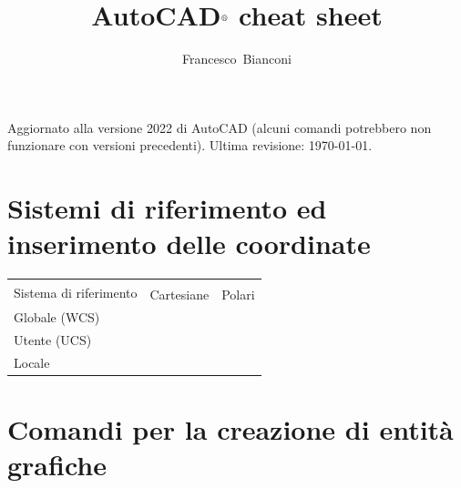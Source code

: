\documentclass[..]{../IEEEphot}
\begin{document}
\title{AutoCAD$^{\text{\textregistered}}$ cheat sheet}

\author{Francesco~Bianconi}


\maketitle
%
%
\thispagestyle{empty}

\vspace{-1.0cm}
\noindent Aggiornato alla versione 2022 di AutoCAD (alcuni comandi potrebbero non funzionare con versioni precedenti). Ultima revisione: \today.

\tableofcontents

\clearpage

\section{Sistemi di riferimento ed inserimento delle coordinate}
\begin{longtable}{m{.3\linewidth}>{\centering\arraybackslash}p{.3\linewidth}>{\centering\arraybackslash}p{.3\linewidth}}
\toprule
\multirow{2}{*}{Sistema di riferimento} & \multicolumn{2}{c}{Tipo di coordinate} \\
\cmidrule{2-3}
 & Cartesiane & Polari \\
\midrule
Globale (WCS) & \multicolumn{1}{c}{*$x$,$y$} & \multicolumn{1}{c}{*$\rho<\theta$} \\
Utente (UCS) & \multicolumn{1}{c}{$x$,$y$} & \multicolumn{1}{c}{$\rho<\theta$} \\
Locale & \multicolumn{1}{c}{@$x$,$y$} & \multicolumn{1}{c}{@$\rho<\theta$} \\
\bottomrule
\end{longtable}

\section{Comandi per la creazione di entità grafiche}
\end{document}
